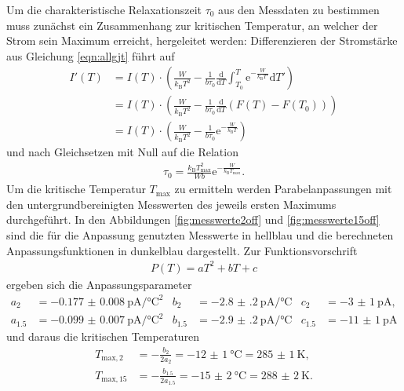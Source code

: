 Um die charakteristische Relaxationszeit $\tau_0$ aus den Messdaten zu bestimmen muss
zunächst ein Zusammenhang zur kritischen Temperatur, an welcher der Strom
sein Maximum erreicht, hergeleitet werden: Differenzieren der Stromstärke aus
Gleichung \eqref{eqn:allgjt} führt auf
\begin{equation}
\begin{aligned}
  I'(T) &= I(T) \cdot \left(\frac{W}{k_\text{B} T^2} - \frac1{b \tau_0} \frac{\mathrm{d}}{\mathrm{d}T} \int_{T_0}^{T} \mathrm{e}^{-\frac{W}{k_\text{B} T'}} \mathrm{d}{T'}\right) \\
  &= I(T) \cdot \left(\frac{W}{k_\text{B} T^2} - \frac1{b \tau_0} \frac{\mathrm{d}}{\mathrm{d}T} \left(F(T) - F(T_0)\right)\right) \\
  &= I(T) \cdot \left(\frac{W}{k_\text{B} T^2} - \frac1{b \tau_0} \mathrm{e}^{-\frac{W}{k_\text{B} T}}\right)
\end{aligned}
\end{equation}
und nach Gleichsetzen mit Null auf die Relation
\begin{align}
  \tau_0 = \frac{k_\text{B} T_\text{max}^2}{W b} \mathrm{e}^{-\frac{W}{k_\text{B} T_\text{max}}}.
  \label{eqn:tau0}
\end{align}
Um die kritische Temperatur $T_\text{max}$ zu ermitteln werden Parabelanpassungen mit den untergrundbereinigten
Messwerten des jeweils ersten Maximums durchgeführt. In den Abbildungen \ref{fig:messwerte2off} und \ref{fig:messwerte15off}
sind die für die Anpassung genutzten Messwerte in hellblau und die berechneten Anpassungsfunktionen in dunkelblau dargestellt.
Zur Funktionsvorschrift
\begin{align}
  P(T) = a T^2 + b T + c
\end{align}
ergeben sich die Anpassungsparameter
\begin{align*}
  a_{2} &= \SI{-0.177(8)}{\pico\ampere\per\celsius\squared} & b_{2} &= \SI{-2.8(2)}{\pico\ampere\per\celsius} & c_{2} &= \SI{-3(1)}{\pico\ampere}, \\
  a_{1.5} &= \SI{-0.099(7)}{\pico\ampere\per\celsius\squared} & b_{1.5} &= \SI{-2.9(2)}{\pico\ampere\per\celsius} & c_{1.5} &= \SI{-11(1)}{\pico\ampere}
\end{align*}
und daraus die kritischen Temperaturen
\begin{align}
  T_{\text{max},2} &= -\frac{b_{2}}{2 a_{2}} = \SI{-12(1)}{\celsius} = \SI{285(1)}{\kelvin},\\
  T_{\text{max},15} &= -\frac{b_{1.5}}{2 a_{1.5}} = \SI{-15(2)}{\celsius} = \SI{288(2)}{\kelvin}.
\end{align}
